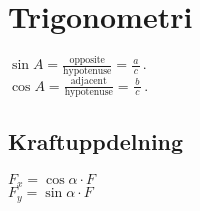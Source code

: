 \section{Trigonometri}
\begin{math}
	\sin A=\frac{\textrm{opposite}}{\textrm{hypotenuse}}=\frac{a}{\,c\,}\,.
\end{math} \\[2pt]

\begin{math}
	\cos A=\frac{\textrm{adjacent}}{\textrm{hypotenuse}}=\frac{b}{\,c\,}\,.
\end{math} \\[2pt]

\subsection{Kraftuppdelning}
\begin{math}
    F_x = \cos \alpha \cdot F
\end{math} \\[2pt]
\begin{math}
    F_y = \sin \alpha \cdot F
\end{math} \\[2pt]


